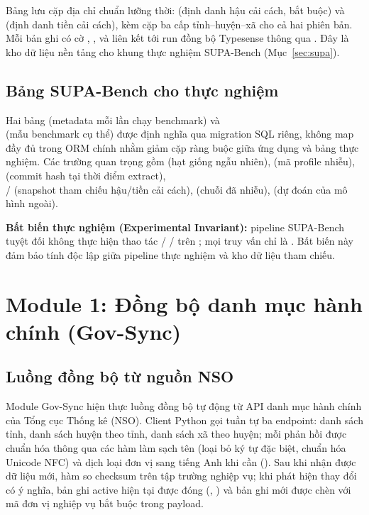 Bảng  lưu cặp địa chỉ chuẩn lưỡng thời:  (định danh hậu cải cách, bắt buộc) và  (định danh tiền cải cách), kèm cặp ba cấp tỉnh--huyện--xã cho cả hai phiên bản. Mỗi bản ghi có cờ , , và liên kết tới run đồng bộ Typesense thông qua . Đây là kho dữ liệu nền tảng cho khung thực nghiệm SUPA-Bench (Mục~\ref{sec:supa}).

\subsection{Bảng SUPA-Bench cho thực nghiệm}
\label{sec:supa-tables}

Hai bảng  (metadata mỗi lần chạy benchmark) và \\  (mẫu benchmark cụ thể) được định nghĩa qua migration SQL riêng, không map đầy đủ trong ORM chính nhằm giảm cặp ràng buộc giữa ứng dụng và bảng thực nghiệm. Các trường quan trọng gồm  (hạt giống ngẫu nhiên),  (mã profile nhiễu),  (commit hash tại thời điểm extract), \\/ (snapshot tham chiếu hậu/tiền cải cách),  (chuỗi đã nhiễu),   (dự đoán của mô hình ngoài).

\textbf{Bất biến thực nghiệm (Experimental Invariant):} pipeline SUPA-Bench tuyệt đối không thực hiện thao tác  /  /  trên ; mọi truy vấn chỉ là . Bất biến này đảm bảo tính độc lập giữa pipeline thực nghiệm và kho dữ liệu tham chiếu.

\section{Module 1: Đồng bộ danh mục hành chính (Gov-Sync)}
\label{sec:gov-sync}

\subsection{Luồng đồng bộ từ nguồn NSO}
\label{sec:nso-sync}

Module Gov-Sync hiện thực luồng đồng bộ tự động từ API danh mục hành chính của Tổng cục Thống kê (NSO). Client Python gọi tuần tự ba endpoint: danh sách tỉnh, danh sách huyện theo tỉnh, danh sách xã theo huyện; mỗi phản hồi được chuẩn hóa thông qua các hàm làm sạch tên (loại bỏ ký tự đặc biệt, chuẩn hóa Unicode NFC) và dịch loại đơn vị sang tiếng Anh khi cần (). Sau khi nhận được dữ liệu mới, hàm  so checksum trên tập trường nghiệp vụ; khi phát hiện thay đổi có ý nghĩa, bản ghi active hiện tại được đóng (, ) và bản ghi mới được chèn với mã đơn vị nghiệp vụ bắt buộc trong payload.

